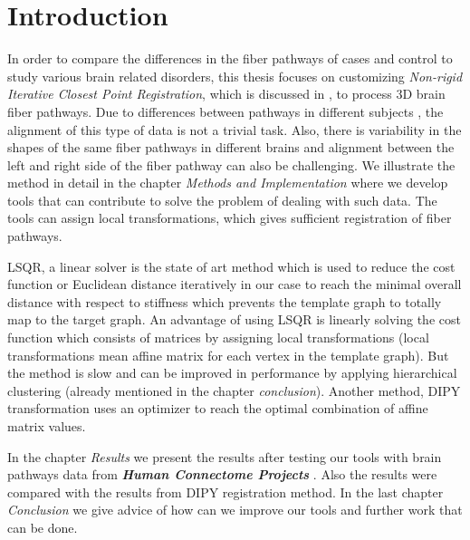 \documentclass[../structure.tex]{subfiles}
\begin{document}
\chapter{Introduction}
In order to compare the differences in the fiber pathways of cases and control to study various brain related disorders, this thesis focuses on customizing \textit{Non-rigid Iterative Closest Point Registration}, which is discussed in \cite{Amberg_2007}, to process 3D brain fiber pathways. Due to differences between pathways in different subjects , the alignment of this type of data is not a trivial task. Also, there is variability in the shapes of the same fiber pathways in different brains and alignment between the left and right side of the fiber pathway can also be challenging. We illustrate the method in detail in the chapter \textit{Methods and Implementation} where we develop tools that can contribute to solve the problem of dealing with such data. The tools can assign local transformations, which gives sufficient registration of fiber pathways. 

LSQR, a linear solver is the state of art method which is used to reduce the cost function or Euclidean distance iteratively in our case to reach the minimal overall distance with respect to stiffness which prevents the template graph to totally map to the target graph. An advantage of using LSQR is linearly solving the cost function which consists of matrices by assigning local transformations (local transformations mean affine matrix for each vertex in the template graph). But the method is slow and can be improved in performance by applying hierarchical clustering (already mentioned in the chapter \textit{conclusion}). Another method, DIPY transformation uses an optimizer to reach the optimal combination of affine matrix values.

In the chapter \textit{Results} we present the results after testing our tools with brain pathways data from \textbf{\textit{Human Connectome Projects}} \cite{CCF}. Also the results were compared with the results from DIPY registration method. In the last chapter \textit{Conclusion} we give advice of how can we improve our tools and further work that can be done.
\end{document}
